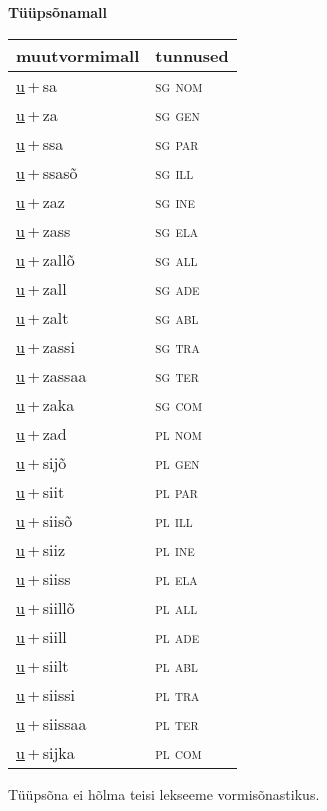 
\vspace{1.8em}
\begin{minipage}{\textwidth}
\textbf{Tüüpsõnamall \,}\\

\begin{sideways}
\begin{tabular}{l l}
muutvormimall & tunnused \\
\hline
\underline{u}\,+\,sa & \textsc{ sg nom } \\
\underline{u}\,+\,za & \textsc{ sg gen } \\
\underline{u}\,+\,ssa & \textsc{ sg par } \\
\underline{u}\,+\,ssasõ & \textsc{ sg ill } \\
\underline{u}\,+\,zaz & \textsc{ sg ine } \\
\underline{u}\,+\,zass & \textsc{ sg ela } \\
\underline{u}\,+\,zallõ & \textsc{ sg all } \\
\underline{u}\,+\,zall & \textsc{ sg ade } \\
\underline{u}\,+\,zalt & \textsc{ sg abl } \\
\underline{u}\,+\,zassi & \textsc{ sg tra } \\
\underline{u}\,+\,zassaa & \textsc{ sg ter } \\
\underline{u}\,+\,zaka & \textsc{ sg com } \\
\underline{u}\,+\,zad & \textsc{ pl nom } \\
\underline{u}\,+\,sijõ & \textsc{ pl gen } \\
\underline{u}\,+\,siit & \textsc{ pl par } \\
\underline{u}\,+\,siisõ & \textsc{ pl ill } \\
\underline{u}\,+\,siiz & \textsc{ pl ine } \\
\underline{u}\,+\,siiss & \textsc{ pl ela } \\
\underline{u}\,+\,siillõ & \textsc{ pl all } \\
\underline{u}\,+\,siill & \textsc{ pl ade } \\
\underline{u}\,+\,siilt & \textsc{ pl abl } \\
\underline{u}\,+\,siissi & \textsc{ pl tra } \\
\underline{u}\,+\,siissaa & \textsc{ pl ter } \\
\underline{u}\,+\,sijka & \textsc{ pl com } \\
\end{tabular}
\end{sideways}
\label{tab:tüüpsõnamall-usa}

\end{minipage}

 
\vspace{1em}
\noindent Tüüpsõna ei hõlma teisi lekseeme vormi\-sõnastikus.
